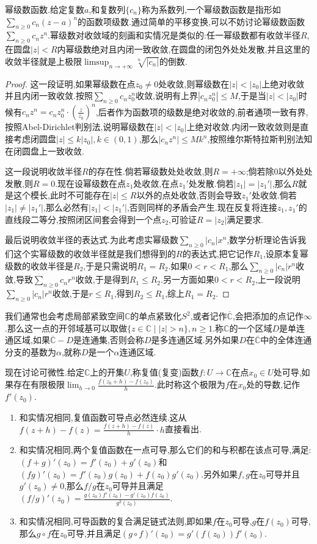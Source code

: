 幂级数函数.给定复数$a$,和复数列$\{c_n\}$称为系数列,一个幂级数函数是指形如$\sum_{n\ge0}c_n(z-a)^n$的函数项级数.通过简单的平移变换,可以不妨讨论幂级数函数$\sum_{n\ge0}c_nz^n$.幂级数对收敛域的刻画和实情况是类似的:任一幂级数都有收敛半径$R$,在圆盘$|z|<R$内幂级数绝对且内闭一致收敛,在圆盘的闭包外处处发散,并且这里的收敛半径就是上极限$\limsup_{n\to+\infty}\sqrt[n]{|c_n|}$的倒数.
\begin{proof}
	
	这一段证明,如果幂级数在点$z_0\not=0$处收敛,则幂级数在$|z|<|z_0|$上绝对收敛并且内闭一致收敛.按照$\sum_{n\ge0}c_nz_0^n$收敛,说明有上界$|c_nz_0^n|\le M$,于是当$|z|<|z_0|$时候有$c_nz^n=c_nz_0^n\cdot\left(\frac{z}{z_0}\right)^n$,后者作为函数项的级数是绝对收敛的,前者通项一致有界,按照Abel-Dirichlet判别法,说明幂级数在$|z|<|z_0|$上绝对收敛.内闭一致收敛则是直接考虑闭圆盘$|z|\le k|z_0|,k\in(0,1)$,那么$|c_nz^n|\le Mk^n$,按照维尔斯特拉斯判别法知在闭圆盘上一致收敛.
	
	这一段说明收敛半径$R$的存在性.倘若幂级数处处收敛,则$R=+\infty$;倘若除0以外处处发散,则$R=0$.现在设幂级数在点$z_1$处收敛,在点$z_1'$处发散.倘若$|z_1|=|z_1'|$,那么$R$就是这个模长,此时不可能存在$|z|\le R$以外的点处收敛,否则会导致$z_1'$处收敛.倘若$|z_1|\not=|z_1'|$,那么必然有$|z_1|<|z_1'|$,否则同样的矛盾会产生.现在反复将连接$z_1,z_1'$的直线段二等分,按照闭区间套会得到一个点$z_2$,可验证$R=|z_2|$满足要求.
	
	最后说明收敛半径的表达式.为此考虑实幂级数$\sum_{n\ge0}|c_n|x^n$,数学分析理论告诉我们这个实幂级数的收敛半径就是我们想得到的$R$的表达式,把它记作$R_1$,设原本复幂级数的收敛半径是$R_2$,于是只需说明$R_1=R_2$.如果$0<r<R_1$,那么$\sum_{n\ge0}|c_n|r^n$收敛,导致$\sum_{n\ge0}c_nr^n$收敛,于是得到$R_1\le R_2$.另一方面如果$0<r<R_2$,上一段说明$\sum_{n\ge0}|c_n|r^n$收敛,于是$r\le R_1$,得到$R_2\le R_1$,综上$R_1=R_2$.
\end{proof}

我们通常也会考虑局部紧致空间$\mathbb{C}$的单点紧致化$S^2$,或者记作$\overline{\mathbb{C}}$,会把添加的点记作$\infty$.那么这一点的开邻域基可以取做$\{z\in\mathbb{C}\mid |z|>n\},n\ge1$.称$\mathbb{C}$的一个区域$D$是单连通区域,如果$\overline{\mathbb{C}}-D$是连通集,否则会称$D$是多连通区域.另外如果$D$在$\overline{\mathbb{C}}$中的全体连通分支的基数为$\alpha$,就称$D$是一个$\alpha$连通区域.

现在讨论可微性.给定$\mathbb{C}$上的开集$U$,称复值(复变)函数$f:U\to\mathbb{C}$在点$x_0\in U$处可导,如果存在有限极限$\lim_{h\to0}\frac{f(z_0+h)-f(z_0)}{h}$.此时称这个极限为$f$在$x_0$处的导数,记作$f'(z_0)$.

\begin{enumerate}
	\item 和实情况相同,复值函数可导点必然连续.这从$f(z+h)-f(z)=\frac{f(z+h)-f(z)}{h}\cdot h$直接看出.
	\item 和实情况相同,两个复值函数在一点可导,那么它们的和与积都在该点可导,满足:$(f+g)'(z_0)=f'(z_0)+g'(z_0)$和$(fg)'(z_0)=f'(z_0)g(z_0)+f(z_0)g'(z_0)$.另外如果$f,g$在$z_0$可导并且$g'(z_0)\not=0$,那么$f/g$在$z_0$可导并且满足$(f/g)'(z_0)=\frac{g(z_0)f'(z_0)-g'(z_0)f(z_0)}{g^2(z_0)}$.
	\item 和实情况相同,可导函数的复合满足链式法则,即如果$f$在$z_0$可导,$g$在$f(z_0)$可导,那么$g\circ f$在$z_0$可导,并且满足$(g\circ f)'(z_0)=g'(f(z_0))f'(z_0)$.
\end{enumerate}

